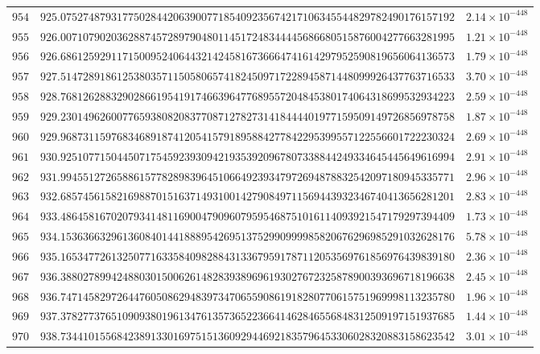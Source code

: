 \documentclass[12pt,reqno]{amsart}
\theoremstyle{remark}
\begin{document}
\begin{longtable}{clc}
$954$ & $925.0752748793177502844206390077185409235674217106345544829782490176157192$ & $2.14\times 10^{-448}$ \\
$955$ & $926.0071079020362887457289790480114517248344445686680515876004277663281995$ & $1.21\times 10^{-448}$ \\
$956$ & $926.6861259291171500952406443214245816736664741614297952590819656064136573$ & $1.79\times 10^{-448}$ \\
$957$ & $927.5147289186125380357115058065741824509717228945871448099926437763716533$ & $3.70\times 10^{-448}$ \\
$958$ & $928.7681262883290286619541917466396477689557204845380174064318699532934223$ & $2.59\times 10^{-448}$ \\
$959$ & $929.2301496260077659380820837708712782731418444401977159509149726856978758$ & $1.87\times 10^{-448}$ \\
$960$ & $929.9687311597683468918741205415791895884277842295399557122556601722230324$ & $2.69\times 10^{-448}$ \\
$961$ & $930.9251077150445071754592393094219353920967807338844249334645445649616994$ & $2.91\times 10^{-448}$ \\
$962$ & $931.9945512726588615778289839645106649239347972694878832542097180945335771$ & $2.96\times 10^{-448}$ \\
$963$ & $932.6857456158216988701516371493100142790849711569443932346740413656281201$ & $2.83\times 10^{-448}$ \\
$964$ & $933.4864581670207934148116900479096079595468751016114093921547179297394409$ & $1.73\times 10^{-448}$ \\
$965$ & $934.1536366329613608401441888954269513752990999985820676296985291032628176$ & $5.78\times 10^{-448}$ \\
$966$ & $935.1653477261325077163358409828843133679591787112053569761856976439839180$ & $2.36\times 10^{-448}$ \\
$967$ & $936.3880278994248803015006261482839389696193027672325878900393696718196638$ & $2.45\times 10^{-448}$ \\
$968$ & $936.7471458297264476050862948397347065590861918280770615751969998113235780$ & $1.96\times 10^{-448}$ \\
$969$ & $937.3782773765109093801961347613573652236641462846556848312509197151937685$ & $1.44\times 10^{-448}$ \\
$970$ & $938.7344101556842389133016975151360929446921835796453306028320883158623542$ & $3.01\times 10^{-448}$ \\

\end{longtable}
\end{document}
